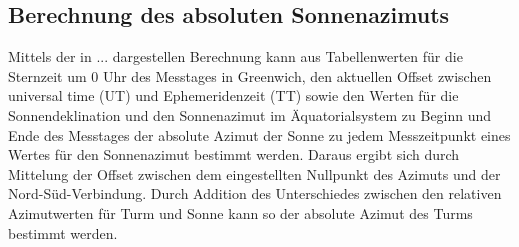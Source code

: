 \subsection{Berechnung des absoluten Sonnenazimuts}
Mittels der in ... dargestellen Berechnung kann aus Tabellenwerten für die Sternzeit um 0 Uhr des Messtages in Greenwich, den aktuellen Offset zwischen universal time (UT) und Ephemeridenzeit (TT) sowie den Werten für die Sonnendeklination und den Sonnenazimut im Äquatorialsystem zu Beginn und Ende des Messtages der absolute Azimut der Sonne zu jedem Messzeitpunkt eines Wertes für den Sonnenazimut bestimmt werden. Daraus ergibt sich durch Mittelung der Offset zwischen dem eingestellten Nullpunkt des Azimuts und der Nord-Süd-Verbindung. 
Durch Addition des Unterschiedes zwischen den relativen Azimutwerten für Turm und Sonne kann so der absolute Azimut des Turms bestimmt werden. 